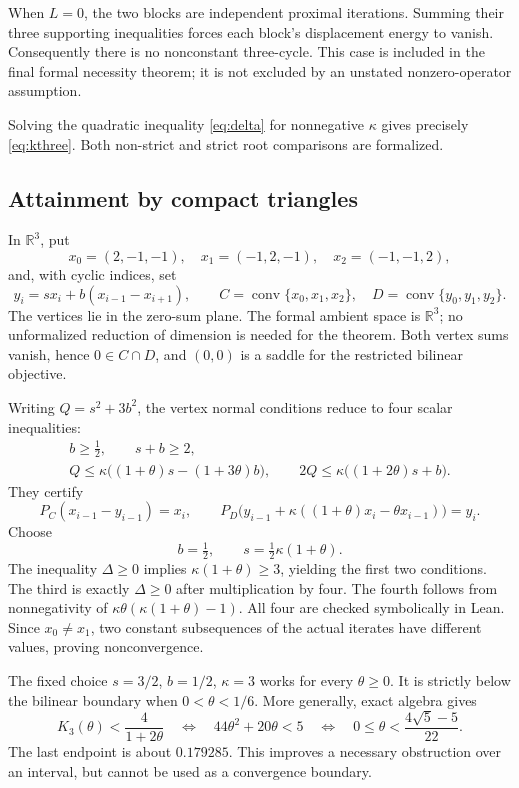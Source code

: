 \documentclass[11pt]{article}
\theoremstyle{remark}\newtheorem{remark}[theorem]{Remark}
\newcommand{\R}{\mathbb R}
\newcommand{\conv}{\operatorname{conv}}
\newcommand{\boundary}{K_3}
\begin{document}
When $L=0$, the two blocks are independent proximal iterations. Summing their three supporting inequalities forces each block's displacement energy to vanish. Consequently there is no nonconstant three-cycle. This case is included in the final formal necessity theorem; it is not excluded by an unstated nonzero-operator assumption.

Solving the quadratic inequality \eqref{eq:delta} for nonnegative $\kappa$ gives precisely \eqref{eq:kthree}. Both non-strict and strict root comparisons are formalized.

\subsection{Attainment by compact triangles}

In $\R^3$, put
\[
 x_0=(2,-1,-1),\quad x_1=(-1,2,-1),\quad x_2=(-1,-1,2),
\]
and, with cyclic indices, set
\[
 y_i=sx_i+b(x_{i-1}-x_{i+1}),\qquad
 C=\conv\{x_0,x_1,x_2\},\quad D=\conv\{y_0,y_1,y_2\}.
\]
The vertices lie in the zero-sum plane. The formal ambient space is $\R^3$; no unformalized reduction of dimension is needed for the theorem. Both vertex sums vanish, hence $0\in C\cap D$, and $(0,0)$ is a saddle for the restricted bilinear objective.

Writing $Q=s^2+3b^2$, the vertex normal conditions reduce to four scalar inequalities:
\begin{equation}\label{eq:triangleineqs}
\begin{gathered}
 b\ge\tfrac12,\qquad s+b\ge2,\\
 Q\le\kappa\bigl((1+\theta)s-(1+3\theta)b\bigr),\qquad
 2Q\le\kappa\bigl((1+2\theta)s+b\bigr).
\end{gathered}
\end{equation}
They certify
\[
 P_C(x_{i-1}-y_{i-1})=x_i,\qquad
 P_D\bigl(y_{i-1}+\kappa((1+\theta)x_i-\theta x_{i-1})\bigr)=y_i.
\]
Choose
\[
 b=\tfrac12,\qquad s=\tfrac12\kappa(1+\theta).
\]
The inequality $\Delta\ge0$ implies $\kappa(1+\theta)\ge3$, yielding the first two conditions. The third is exactly $\Delta\ge0$ after multiplication by four. The fourth follows from nonnegativity of $\kappa\theta(\kappa(1+\theta)-1)$. All four are checked symbolically in Lean. Since $x_0\ne x_1$, two constant subsequences of the actual iterates have different values, proving nonconvergence.

The fixed choice $s=3/2$, $b=1/2$, $\kappa=3$ works for every $\theta\ge0$. It is strictly below the bilinear boundary when $0<\theta<1/6$. More generally, exact algebra gives
\begin{equation}\label{eq:cross}
 \boundary(\theta)<\frac4{1+2\theta}
 \quad\Longleftrightarrow\quad
 44\theta^2+20\theta<5
 \quad\Longleftrightarrow\quad
 0\le\theta<\frac{4\sqrt5-5}{22}.
\end{equation}
The last endpoint is about $0.179285$. This improves a necessary obstruction over an interval, but cannot be used as a convergence boundary.
\end{document}
